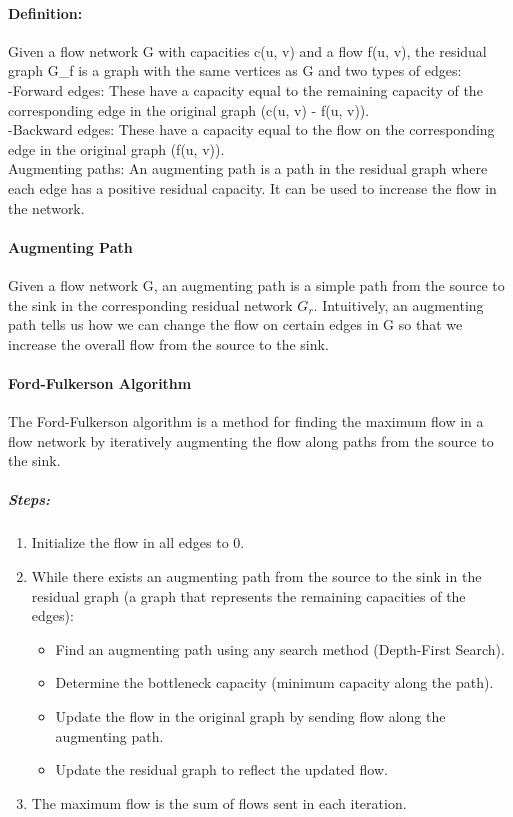 \documentclass[10pt]{article}
\begin{document}
\paragraph{Definition:} Given a flow network G with capacities c(u, v) and a flow f(u, v), the residual graph G\_f is a graph with the same vertices as G and two types of edges:\\
-Forward edges: These have a capacity equal to the remaining capacity of the corresponding edge in the original graph (c(u, v) - f(u, v)).\\
-Backward edges: These have a capacity equal to the flow on the corresponding edge in the original graph (f(u, v)).\\
Augmenting paths: An augmenting path is a path in the residual graph where each edge has a positive residual capacity. It can be used to increase the flow in the network.
\paragraph{Augmenting Path}
Given a flow network G, an augmenting path is a simple path from the source to the sink in the corresponding residual network $G_r$. Intuitively, an augmenting path tells us how we can change the flow on certain edges in G so that we increase the overall flow from the source to the sink.
\paragraph{Ford-Fulkerson Algorithm}
The Ford-Fulkerson algorithm is a method for finding the maximum flow in a flow network by iteratively augmenting the flow along paths from the source to the sink.
\subparagraph{Steps:}
\begin{enumerate}
    \item Initialize the flow in all edges to 0.
    \item While there exists an augmenting path from the source to the sink in the residual graph (a graph that represents the remaining capacities of the edges):
          \begin{itemize}
              \item Find an augmenting path using any search method (Depth-First Search).
              \item Determine the bottleneck capacity (minimum capacity along the path).
              \item Update the flow in the original graph by sending flow along the augmenting path.
              \item Update the residual graph to reflect the updated flow.
          \end{itemize}
    \item The maximum flow is the sum of flows sent in each iteration.
\end{enumerate}
\end{document}
